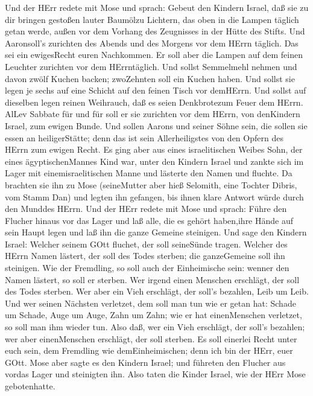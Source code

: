  Und der HErr redete mit Mose und sprach: 
Gebeut den Kindern Israel, daß sie zu dir bringen gestoßen lauter
Baumölzu Lichtern, das oben in die Lampen täglich getan werde,
 außen vor dem Vorhang des Zeugnisses in der Hütte des
Stifts. Und Aaronsoll's zurichten des Abends und des Morgens vor dem
HErrn täglich. Das sei ein ewigesRecht euren Nachkommen.  Er
soll aber die Lampen auf dem feinen Leuchter zurichten vor dem
HErrntäglich.  Und sollst Semmelmehl nehmen und davon zwölf
Kuchen backen; zwoZehnten soll ein Kuchen haben.  Und sollst
sie legen je sechs auf eine Schicht auf den feinen Tisch vor demHErrn.
 Und sollst auf dieselben legen reinen Weihrauch, daß es
seien Denkbrotezum Feuer dem HErrn.  AlLev Sabbate für und
für soll er sie zurichten vor dem HErrn, von denKindern Israel, zum
ewigen Bunde.  Und sollen Aarons und seiner Söhne sein, die
sollen sie essen an heiligerStätte; denn das ist sein Allerheiligstes
von den Opfern des HErrn zum ewigen Recht.  Es ging aber
aus eines israelitischen Weibes Sohn, der eines ägyptischenMannes Kind
war, unter den Kindern Israel und zankte sich im Lager mit
einemisraelitischen Manne  und lästerte den Namen und
fluchte. Da brachten sie ihn zu Mose (seineMutter aber hieß Selomith,
eine Tochter Dibris, vom Stamm Dan)  und legten ihn
gefangen, bis ihnen klare Antwort würde durch den Munddes HErrn.
 Und der HErr redete mit Mose und sprach: 
Führe den Flucher hinaus vor das Lager und laß alle, die es gehört
haben,ihre Hände auf sein Haupt legen und laß ihn die ganze Gemeine
steinigen.  Und sage den Kindern Israel: Welcher seinem
GOtt fluchet, der soll seineSünde tragen.  Welcher des
HErrn Namen lästert, der soll des Todes sterben; die ganzeGemeine soll
ihn steinigen. Wie der Fremdling, so soll auch der Einheimische sein:
wenner den Namen lästert, so soll er sterben.  Wer irgend
einen Menschen erschlägt, der soll des Todes sterben.  Wer
aber ein Vieh erschlägt, der soll's bezahlen, Leib um Leib.
 Und wer seinen Nächsten verletzet, dem soll man tun wie er
getan hat:  Schade um Schade, Auge um Auge, Zahn um Zahn;
wie er hat einenMenschen verletzet, so soll man ihm wieder tun.
 Also daß, wer ein Vieh erschlägt, der soll's bezahlen; wer
aber einenMenschen erschlägt, der soll sterben.  Es soll
einerlei Recht unter euch sein, dem Fremdling wie demEinheimischen; denn
ich bin der HErr, euer GOtt.  Mose aber sagte es den
Kindern Israel; und führeten den Flucher aus vordas Lager und steinigten
ihn. Also taten die Kinder Israel, wie der HErr Mose gebotenhatte.

